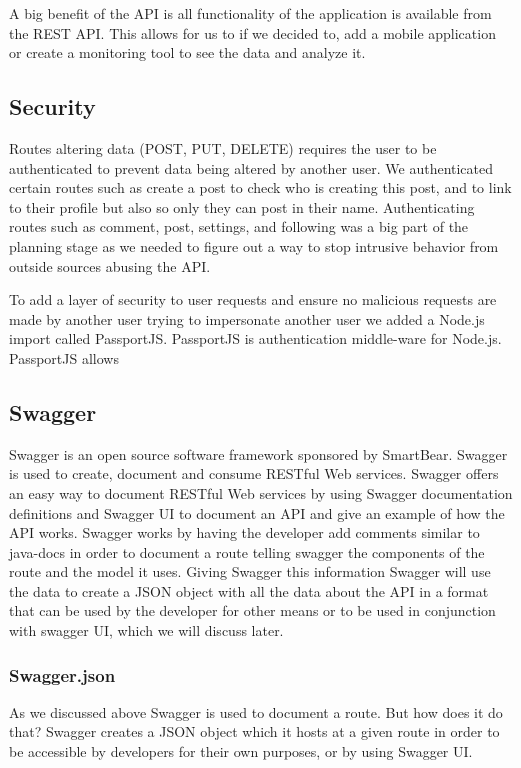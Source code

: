 A big benefit of the API is all functionality of the application is available from the REST API. This allows for us to if we decided to, add a mobile application or create a monitoring tool to see the data and analyze it. \cite{124257720160101}

\subsection{Security}
Routes altering data (POST, PUT, DELETE) requires the user to be authenticated to prevent data being altered by another user. We authenticated certain routes such as create a post to check who is creating this post, and to link to their profile but also so only they can post in their name. Authenticating routes such as comment, post, settings, and following was a big part of the planning stage as we needed to figure out a way to stop intrusive behavior from outside sources abusing the API.

To add a layer of security to user requests and ensure no malicious requests are made by another user trying to impersonate another user we added a Node.js import called PassportJS. PassportJS is authentication middle-ware for Node.js. PassportJS allows

\subsection{Swagger}
Swagger is an open source software framework sponsored by SmartBear. Swagger is used to create, document and consume  RESTful Web services. Swagger offers an easy way to document RESTful Web services by using Swagger documentation definitions and Swagger UI to document an API and give an example of how the API works. Swagger works by having the developer add comments similar to java-docs in order to document a route telling swagger the components of the route and the model it uses. Giving Swagger this information Swagger will use the data to create a JSON object with all the data about the API in a format that can be used by the developer for other means or to be used in conjunction with swagger UI, which we will discuss later.

\subsubsection{Swagger.json}
As we discussed above Swagger is used to document a route. But how does it do that? Swagger creates a JSON object which it hosts at a given route in order to be accessible by developers for their own purposes, or by using Swagger UI.

